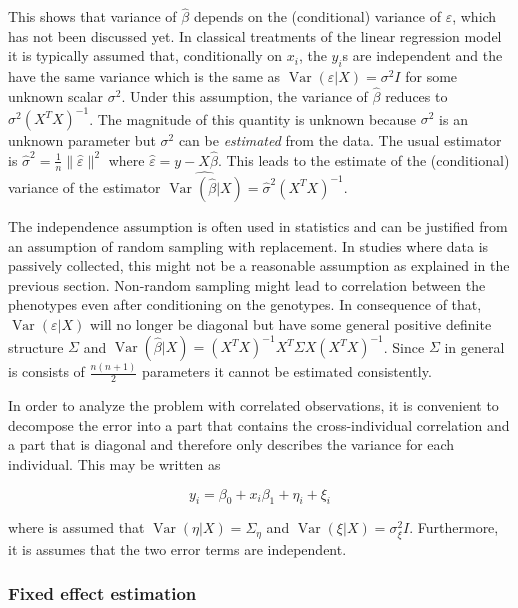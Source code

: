 \documentclass[review]{siamart0516}
\DeclareMathOperator{\Var}{Var}
\begin{document}
This shows that variance of $\hat{\beta}$ depends on the (conditional) variance of $\varepsilon$, which has not been discussed yet. In classical treatments of the linear regression model it is typically assumed that, conditionally on $x_i$, the $y_i$s are independent and the have the same variance which is the same as $\Var(\varepsilon|X)=\sigma^2 I$ for some unknown scalar $\sigma^2$. Under this assumption, the variance of $\hat{\beta}$ reduces to $\sigma^2 (X^TX)^{-1}$. The magnitude of this quantity is unknown because $\sigma^2$ is an unknown parameter but $\sigma^2$ can be \emph{estimated} from the data. The usual estimator is
$\hat{\sigma}^2=\frac{1}{n} \|\hat{\varepsilon}\|^2$
where $\hat{\varepsilon} = y - X\hat{\beta}$.
This leads to the estimate of the (conditional) variance of the estimator $\widehat{\Var(\hat{\beta}|X)} = \hat{\sigma}^2(X^TX)^{-1}$.

The independence assumption is often used in statistics and can be justified from an assumption of random sampling with replacement. In studies where data is passively collected, this might not be a reasonable assumption as explained in the previous section. Non-random sampling might lead to correlation between the phenotypes even after conditioning on the genotypes. In consequence of that, $\Var(\varepsilon|X)$ will no longer be diagonal but have some general positive definite structure $\Sigma$ and $\Var(\hat{\beta}|X)=(X^TX)^{-1}X^T\Sigma X(X^TX)^{-1}$. Since $\Sigma$ in general is consists of $\frac{n(n+1)}{2}$ parameters it cannot be estimated consistently.

In order to analyze the problem with correlated observations, it is convenient to decompose the error into a part that contains the cross-individual correlation and a part that is diagonal and therefore only describes the variance for each individual. This may be written as

\begin{equation*}
    y_i = \beta_0 + x_i\beta_1 + \eta_i + \xi_i
\end{equation*}

where is assumed that $\Var(\eta|X)=\Sigma_\eta$ and $\Var(\xi|X)=\sigma^2_\xi I$. Furthermore, it is assumes that the two error terms are independent.


\label{sec:regress-correction}
\subsubsection{Fixed effect estimation}
\end{document}
